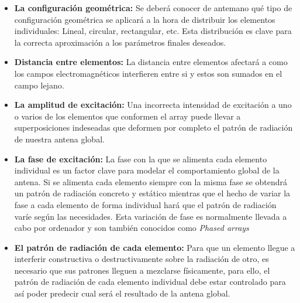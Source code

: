 \begin{itemize}
\item \textbf{La configuración geométrica: }Se deberá conocer de antemano qué tipo de configuración geométrica se aplicará a la hora de distribuir los elementos individuales: Lineal, circular, rectangular, etc. Esta distribución es clave para la correcta aproximación a los parámetros finales deseados.

\item \textbf{Distancia entre elementos: }La distancia entre elementos  afectará a como los campos electromagnéticos interfieren entre si y estos son sumados en el campo lejano.

\item \textbf{La amplitud de excitación: }Una incorrecta intensidad de excitación a uno o varios de los elementos que conformen el array puede llevar a superposiciones indeseadas que deformen por completo el patrón de radiación de nuestra antena global.

\item \textbf{La fase de excitación: }La fase con la que se alimenta cada elemento individual es un factor clave para modelar el comportamiento global de la antena. Si se alimenta cada elemento siempre con la misma fase se obtendrá un patrón de radiación concreto y estático mientras que el hecho de variar la fase a cada elemento de forma individual hará que el patrón de radiación varíe según las necesidades. Esta variación de fase es normalmente llevada a cabo por ordenador y son también conocidos como \textit{Phased arrays}

\item \textbf{El patrón de radiación de cada elemento: }Para que un elemento llegue a interferir constructiva o destructivamente sobre la radiación de otro, es necesario que sus patrones lleguen a mezclarse físicamente, para ello, el patrón de radiación de cada elemento individual debe estar controlado para así poder predecir cual será el resultado de la antena global.
\end{itemize}

